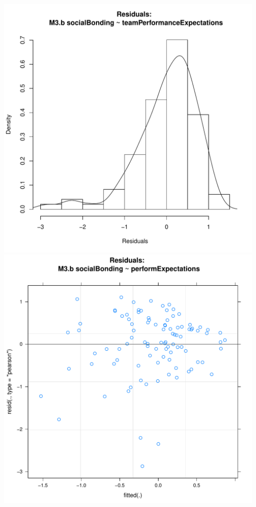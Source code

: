 \documentclass[12pt]{report}
\begin{document}


\newpage
\centering
\includegraphics[scale =.4]{../images/MLM3bHist.pdf}
\includegraphics[scale =.4]{../images/MLM3bScatter.pdf}
\end{document}
